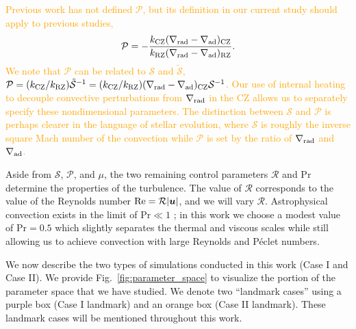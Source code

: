 \documentclass[twocolumn, linenumbers]{aastex631}
\newcommand{\gradrad}{\ensuremath{\nabla_{\rm{rad}}}}
\newcommand{\gradad}{\ensuremath{\nabla_{\rm{ad}}}}
\newcommand{\mP}{\ensuremath{\mathcal{P}}}
\newcommand{\mR}{\ensuremath{\mathcal{R}}}
\newcommand{\mS}{\ensuremath{\mathcal{S}}}
\newcommand\Pran{\ensuremath{\mathrm{Pr}}}
\renewcommand{\vec}[1]{\boldsymbol{#1}}
\newcommand{\editone}[1]{\textcolor{orange}{#1}}
\begin{document}
\editone{
    Previous work has not defined $\mP$, but its definition in our current study should apply to previous studies,
    \begin{equation}
        \mP = -\frac{k_{\rm{CZ}}(\gradrad - \gradad)_{\rm{CZ}}}{k_{\rm{RZ}}(\gradrad - \gradad)_{\rm{RZ}}}.
    \end{equation}
    We note that $\mP$ can be related to $\mS$ and $\tilde{\mS}$, $\mP = (k_{\rm{CZ}}/k_{\rm{RZ}}) \tilde{\mS}^{-1} = (k_{\rm{CZ}}/k_{\rm{RZ}}) (\gradrad - \gradad)_{\rm{CZ}} \mS^{-1}$.
    Our use of internal heating to decouple convective perturbations from $\gradrad$ in the CZ allows us to separately specify these nondimensional parameters.
    The distinction between $\mS$ and $\mP$ is perhaps clearer in the language of stellar evolution, where $\mS$ is roughly the inverse square Mach number of the convection while $\mP$ is set by the ratio of $\gradrad$ and $\gradad$.
}

Aside from $\mS$, $\mP$, and $\mu$, the two remaining control parameters $\mR$ and $\Pran$ determine the properties of the turbulence.
The value of $\mR$ corresponds to the value of the Reynolds number $\rm{Re} = \mR |\vec{u}|$, and we will vary $\mR$.
Astrophysical convection exists in the limit of $\Pran \ll 1$ \citep{garaud2021}; in this work we choose a modest value of $\Pran = 0.5$ which slightly separates the thermal and viscous scales while still allowing us to achieve convection with large Reynolds and P\'{e}clet numbers.

We now describe the two types of simulations conducted in this work (Case I and Case II).
We provide Fig.~\ref{fig:parameter_space} to visualize the portion of the parameter space that we have studied.
We denote two ``landmark cases'' using a purple box (Case I landmark) and an orange box (Case II landmark).
These landmark cases will be mentioned throughout this work.
\end{document}
